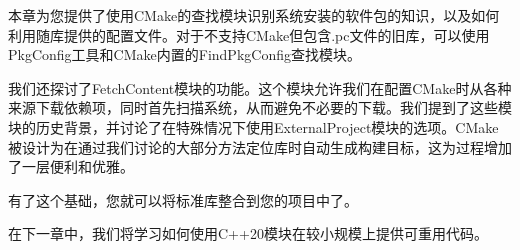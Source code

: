 本章为您提供了使用CMake的查找模块识别系统安装的软件包的知识，以及如何利用随库提供的配置文件。对于不支持CMake但包含.pc文件的旧库，可以使用PkgConfig工具和CMake内置的FindPkgConfig查找模块。

我们还探讨了FetchContent模块的功能。这个模块允许我们在配置CMake时从各种来源下载依赖项，同时首先扫描系统，从而避免不必要的下载。我们提到了这些模块的历史背景，并讨论了在特殊情况下使用ExternalProject模块的选项。CMake被设计为在通过我们讨论的大部分方法定位库时自动生成构建目标，这为过程增加了一层便利和优雅。

有了这个基础，您就可以将标准库整合到您的项目中了。

在下一章中，我们将学习如何使用C++20模块在较小规模上提供可重用代码。